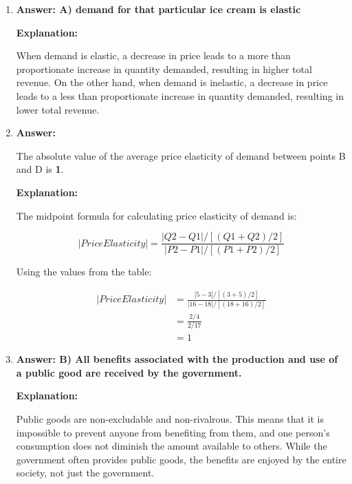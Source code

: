 \documentclass{article}
\begin{document}
\begin{enumerate}
    \item \textbf{Answer: A) demand for that particular ice cream is elastic}

          \textbf{Explanation:}

          When demand is elastic, a decrease in price leads to a more than proportionate increase in quantity demanded, resulting in higher total revenue. On the other hand, when demand is inelastic, a decrease in price leads to a less than proportionate increase in quantity demanded, resulting in lower total revenue.

    \item \textbf{Answer:}

          The absolute value of the average price elasticity of demand between points B and D is \textbf{1}.

          \textbf{Explanation:}

          The midpoint formula for calculating price elasticity of demand is:

          \begin{equation*}
              |Price Elasticity| = \frac{|Q2 - Q1| / [(Q1 + Q2) / 2]}{|P2 - P1| / [(P1 + P2) / 2]}
          \end{equation*}

          Using the values from the table:

          \begin{align*}
              |Price Elasticity| & = \frac{|5 - 3| / [(3 + 5) / 2]}{|16 - 18| / [(18 + 16) / 2]} \\
                                 & = \frac{2 / 4}{2 / 17}                                        \\
                                 & = 1
          \end{align*}

    \item \textbf{Answer: B) All benefits associated with the production and use of a public good are received by the government.}

          \textbf{Explanation:}

          Public goods are non-excludable and non-rivalrous. This means that it is impossible to prevent anyone from benefiting from them, and one person's consumption does not diminish the amount available to others. While the government often provides public goods, the benefits are enjoyed by the entire society, not just the government.
\end{enumerate}
\end{document}
